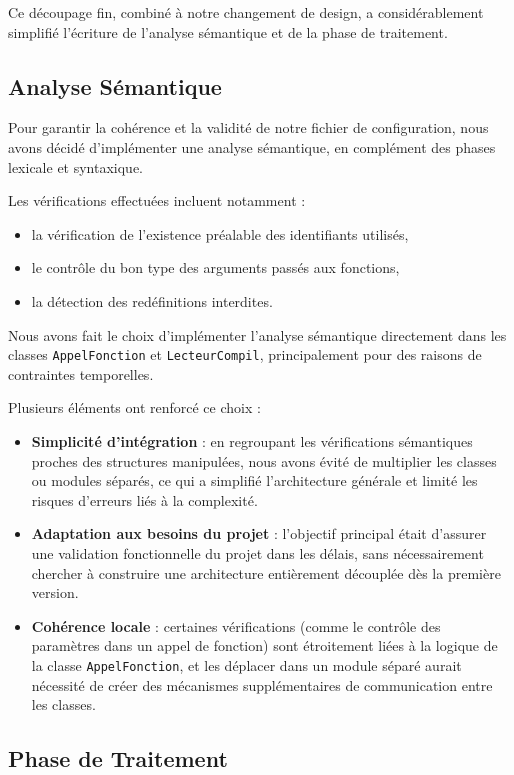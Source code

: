 Ce découpage fin, combiné à notre changement de design, a considérablement simplifié l’écriture de l’analyse sémantique et de la phase de traitement.


\subsection{Analyse Sémantique}

Pour garantir la cohérence et la validité de notre fichier de configuration, nous avons décidé d’implémenter une analyse sémantique, en complément des phases lexicale et syntaxique.

Les vérifications effectuées incluent notamment :
\begin{itemize}
    \item la vérification de l’existence préalable des identifiants utilisés,
    \item le contrôle du bon type des arguments passés aux fonctions,
    \item la détection des redéfinitions interdites.
\end{itemize}

Nous avons fait le choix d’implémenter l’analyse sémantique directement dans les classes \texttt{AppelFonction} et \texttt{LecteurCompil}, principalement pour des raisons de contraintes temporelles.

Plusieurs éléments ont renforcé ce choix :
\begin{itemize}
    \item \textbf{Simplicité d’intégration} : en regroupant les vérifications sémantiques proches des structures manipulées, nous avons évité de multiplier les classes ou modules séparés, ce qui a simplifié l’architecture générale et limité les risques d’erreurs liés à la complexité.
    \item \textbf{Adaptation aux besoins du projet} : l’objectif principal était d’assurer une validation fonctionnelle du projet dans les délais, sans nécessairement chercher à construire une architecture entièrement découplée dès la première version.
    \item \textbf{Cohérence locale} : certaines vérifications (comme le contrôle des paramètres dans un appel de fonction) sont étroitement liées à la logique de la classe \texttt{AppelFonction}, et les déplacer dans un module séparé aurait nécessité de créer des mécanismes supplémentaires de communication entre les classes.
\end{itemize}

\subsection{Phase de Traitement}

